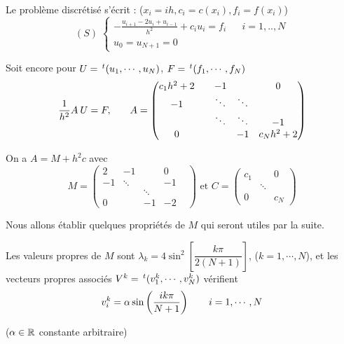 Le problème discrétisé s'écrit : ($x_i = ih, c_i = c(x_i), f_i = f(x_i)$)
\[
    (S) \;
    \left\lbrace
    \begin{array}{ccc}
        -\frac{u_{i+1} - 2 u_i + u_{i-1}}{h^2} + c_i u_i = f_i & & i=1,..,N \\
        u_0=u_{N+1}=0
    \end{array}
    \right.
\]

Soit encore pour $U=\,^t(u_1,\cdots,u_N)$, $F = \,^t(f_1, \cdots,f_N)$
\[
    \begin{array}{ccc}
        \dfrac{1}{h^2}A \: U = F,
        & \hfill &
        A =
        \begin{pmatrix}
            c_1 h^2 + 2 & & -1 & & 0 \\
            -1 & & \ddots & \ddots & \\
            & & \ddots & \ddots & -1 \\
            0 & & & -1 & c_N h^2 + 2
        \end{pmatrix}
    \end{array}
\]

On a $A = M + h^2 c$ avec 
\[
    M = 
    \begin{pmatrix}
        2 & -1 & & 0 \\
        -1 & \ddots & & -1 \\
        & & \ddots & & \\
        0 & & -1 & -2
    \end{pmatrix}
    \text{ et } 
    C =
    \begin{pmatrix}
        c_1 & & 0 \\
        & \ddots & \\
        0 & & c_N
    \end{pmatrix}
\]

Nous allons établir quelques propriétés de $M$ qui seront utiles par la suite.

\begin{lemme}
    Les valeurs propres de $M$ sont $\lambda_k = 4 \sin^2 \left[ \dfrac{k\pi}{2(N+1)} \right]$, ($k=1,\cdots,N$), et les vecteurs propres associés
    $V^k = \,^t(v_1^k, \cdots , v_N^k)$ vérifient
    \[
        v_i^k = \alpha \sin \left( \frac{ik\pi}{N+1} \right) \hspace{0.7cm} i=1,\cdots,N
    \]

    ($\alpha \in \mathbb{R}$ constante arbitraire)
    \label{lemme:1-pbvp-lemme1}
\end{lemme}

